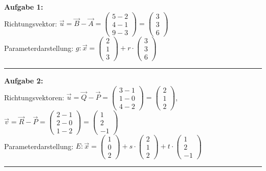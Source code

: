\documentclass[12pt,a4paper]{article}
\newcommand{\vek}[1]{\vec{#1}}
\begin{document}
\textbf{Aufgabe 1:} \\
Richtungsvektor: $\vek{u} = \vek{B} - \vek{A} = \begin{pmatrix}5-2\\4-1\\9-3\end{pmatrix} = \begin{pmatrix}3\\3\\6\end{pmatrix}$ \\
Parameterdarstellung: $g: \vek{x} = \begin{pmatrix}2\\1\\3\end{pmatrix} + r \cdot \begin{pmatrix}3\\3\\6\end{pmatrix}$
\begin{center}\rule{0.8\linewidth}{0.4pt}\end{center}

\textbf{Aufgabe 2:} \\
Richtungsvektoren: $\vek{u} = \vek{Q} - \vek{P} = \begin{pmatrix}3-1\\1-0\\4-2\end{pmatrix} = \begin{pmatrix}2\\1\\2\end{pmatrix}$, $\vek{v} = \vek{R} - \vek{P} = \begin{pmatrix}2-1\\2-0\\1-2\end{pmatrix} = \begin{pmatrix}1\\2\\-1\end{pmatrix}$ \\
Parameterdarstellung: $E: \vek{x} = \begin{pmatrix}1\\0\\2\end{pmatrix} + s \cdot \begin{pmatrix}2\\1\\2\end{pmatrix} + t \cdot \begin{pmatrix}1\\2\\-1\end{pmatrix}$
\begin{center}\rule{0.8\linewidth}{0.4pt}\end{center}
\end{document}
